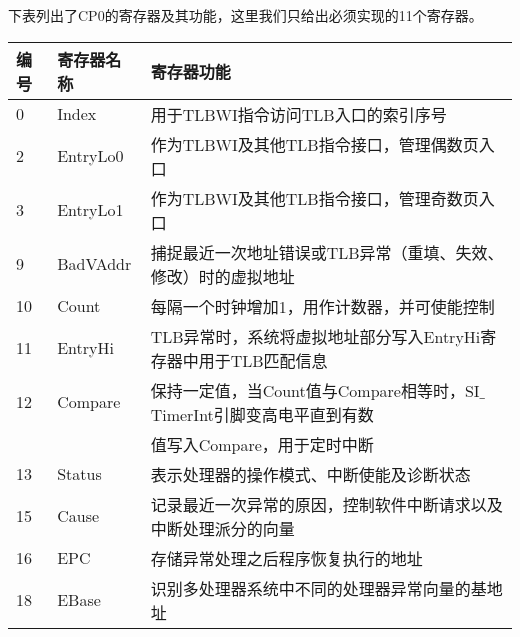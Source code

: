 下表列出了CP0的寄存器及其功能，这里我们只给出必须实现的11个寄存器。

\begin{table}[H]
\centering
\begin{tabular}{lll}
\hline
编号&寄存器名称&寄存器功能\\
\hline
0&Index&用于TLBWI指令访问TLB入口的索引序号\\
2&EntryLo0&作为TLBWI及其他TLB指令接口，管理偶数页入口\\
3&EntryLo1&作为TLBWI及其他TLB指令接口，管理奇数页入口\\
9&BadVAddr&捕捉最近一次地址错误或TLB异常（重填、失效、修改）时的虚拟地址\\
10&Count&每隔一个时钟增加1，用作计数器，并可使能控制\\
11&EntryHi&TLB异常时，系统将虚拟地址部分写入EntryHi寄存器中用于TLB匹配信息\\
12&Compare&保持一定值，当Count值与Compare相等时，SI$\_$TimerInt引脚变高电平直到有数\\
&&值写入Compare，用于定时中断\\
13&Status&表示处理器的操作模式、中断使能及诊断状态\\
15&Cause&记录最近一次异常的原因，控制软件中断请求以及中断处理派分的向量\\
16&EPC&存储异常处理之后程序恢复执行的地址\\
18&EBase&识别多处理器系统中不同的处理器异常向量的基地址\\
\hline
\end{tabular}
\end{table}

